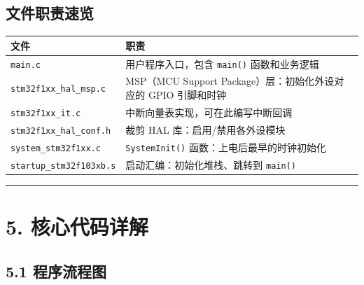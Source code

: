 \documentclass[
  chinese,
  UTF8,
  oneside,
  openany]{ctexbook}
\begin{document}
\subsection{文件职责速览}\label{ux6587ux4ef6ux804cux8d23ux901fux89c8}

\begin{longtable}[]{@{}
  >{\raggedright\arraybackslash}p{}
  >{\raggedright\arraybackslash}p{}@{}}
\toprule\noalign{}
\begin{minipage}[b]{\linewidth}\raggedright
文件
\end{minipage} & \begin{minipage}[b]{\linewidth}\raggedright
职责
\end{minipage} \\
\midrule\noalign{}
\endhead
\bottomrule\noalign{}
\endlastfoot
\texttt{main.c} & 用户程序入口，包含 \texttt{main()} 函数和业务逻辑 \\
\texttt{stm32f1xx\_hal\_msp.c} & MSP（MCU Support
Package）层：初始化外设对应的 GPIO 引脚和时钟 \\
\texttt{stm32f1xx\_it.c} & 中断向量表实现，可在此编写中断回调 \\
\texttt{stm32f1xx\_hal\_conf.h} & 裁剪 HAL 库：启用/禁用各外设模块 \\
\texttt{system\_stm32f1xx.c} & \texttt{SystemInit()}
函数：上电后最早的时钟初始化 \\
\texttt{startup\_stm32f103xb.s} & 启动汇编：初始化堆栈、跳转到
\texttt{main()} \\
\end{longtable}

\begin{center}\rule{0.5\linewidth}{0.5pt}\end{center}

\section{5. 核心代码详解}\label{ux6838ux5fc3ux4ee3ux7801ux8be6ux89e3}

\subsection{5.1 程序流程图}\label{ux7a0bux5e8fux6d41ux7a0bux56fe}
\end{document}
